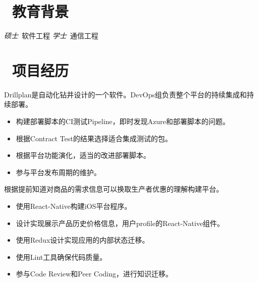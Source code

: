\documentclass{resume}
\begin{document}


 
\section{\faGraduationCap\  教育背景}
\textit{硕士}\ 软件工程
\textit{学士}\ 通信工程

\section{\faUsers\ 项目经历}
Drillplan是自动化钻井设计的一个软件。DevOps组负责整个平台的持续集成和持续部署。
\begin{itemize}
  \item 构建部署脚本的CI测试Pipeline，即时发现Azure和部署脚本的问题。
  \item 根据Contract Test的结果选择适合集成测试的包。
  \item 根据平台功能演化，适当的改进部署脚本。
  \item 参与平台发布周期的维护。
\end{itemize}

根据提前知道对商品的需求信息可以换取生产者优惠的理解构建平台。
\begin{itemize}
  \item 使用React-Native构建iOS平台程序。
  \item 设计实现展示产品历史价格信息，用户profile的React-Native组件。
  \item 使用Redux设计实现应用的内部状态迁移。
  \item 使用Lint工具确保代码质量。
  \item 参与Code Review和Peer Coding，进行知识迁移。
\end{itemize}
\end{document}
